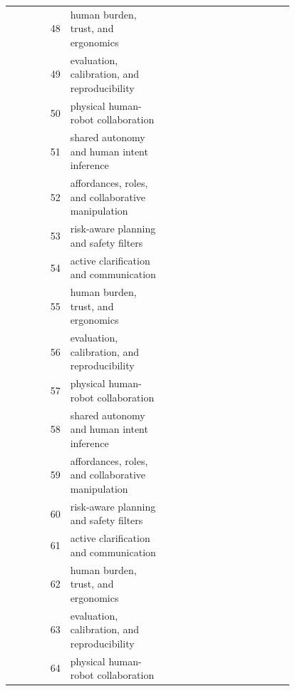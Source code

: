 \documentclass{article}
\begin{document}
\begin{longtable}{r p{0.34\linewidth} p{0.45\linewidth}}
48 & human burden, trust, and ergonomics & \citep{pizzagalli2021usercentered142,gross2023a143,liu2019remote144} \\
49 & evaluation, calibration, and reproducibility & \citep{malik2018digital145,hoebert2024a146,wang2019facilitating147} \\
50 & physical human-robot collaboration & \citep{liu2025a148,zorman2023transferring149,cordon2025leveraging150} \\
51 & shared autonomy and human intent inference & \citep{wang2025cori151,chowdhury2023humanrobot152,weidemann2021the153} \\
52 & affordances, roles, and collaborative manipulation & \citep{sosaceron2022learning154,bogner2018optimised155,obidat2023development156} \\
53 & risk-aware planning and safety filters & \citep{heisler2021optimization157,zhang2021a158,ding2018a159} \\
54 & active clarification and communication & \citep{chacon2021cognitive160,cheng2017manufacturing161,cherubini2016collaborative162} \\
55 & human burden, trust, and ergonomics & \citep{aydn2020a163,grushko2021improved164,kim2021variable165} \\
56 & evaluation, calibration, and reproducibility & \citep{inam2018risk166,aydn2018stable167,othman2022an168} \\
57 & physical human-robot collaboration & \citep{wang2017humanrobot169,rabby2024performanceaware170,liu2022intention171} \\
58 & shared autonomy and human intent inference & \citep{berx2024a172,dimitropoulos2021operator173,mangin2022how174} \\
59 & affordances, roles, and collaborative manipulation & \citep{huang2019a175,anvaripour2020fmg176,liang2020bidirectional177} \\
60 & risk-aware planning and safety filters & \citep{shibata2003subjective178,zheng2020an179,amin2020a180} \\
61 & active clarification and communication & \citep{cremer2020modelfree181,prati2021use182,buchem2024humanrobot183} \\
62 & human burden, trust, and ergonomics & \citep{niu2021human184,crivelli2025industrial185,kekana2025a186} \\
63 & evaluation, calibration, and reproducibility & \citep{vinanzi2021the187,roveda2023optimal188,ranatunga2015intent189} \\
64 & physical human-robot collaboration & \citep{moghaddam2026adaptive190,wang2025dynamic191,manoharan2025affordable192} \\

\end{longtable}
\end{document}
